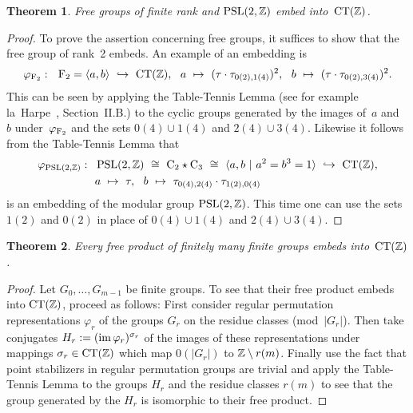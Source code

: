 \documentclass{amsart}
\theoremstyle{definition} \newtheorem{CTZDefinition}{Definition}[section]
\theoremstyle{plain}      \newtheorem{CTZPropertiesTheorem}[CTZDefinition]{Theorem}
\theoremstyle{plain}      \newtheorem{CTZSubgroupsTheorem}[CTZDefinition]{Theorem}
\theoremstyle{definition} \newtheorem{RcwaMappingDefinition}{Definition}[section]
\theoremstyle{definition} \newtheorem{RCWADefinition}[RcwaMappingDefinition]{Definition}
\theoremstyle{plain}      \newtheorem{CTZNotFinitelyGeneratedTheorem}
\theoremstyle{definition} \newtheorem{CTZSmEmbeddingDefinition}[RcwaMappingDefinition]{Definition}
\theoremstyle{plain}      \newtheorem{CTZHighlyTransitiveTheorem}[RcwaMappingDefinition]{Theorem}
\theoremstyle{plain}      \newtheorem{CTZTorsionElementsDivisibleTheorem}
\theoremstyle{plain}      \newtheorem{CTLemma}{Lemma}[section]
\theoremstyle{plain}      \newtheorem{IntegralCommutatorLemma}[CTLemma]{Lemma}
\theoremstyle{plain}      \newtheorem{NormalSubgroupContainsIntegralElementLemma}[CTLemma]{Lemma}
\theoremstyle{plain}      \newtheorem{CTZSimpleTheorem}[CTLemma]{Theorem}
\theoremstyle{remark}     \newtheorem{CTZSimpleRemark}[CTLemma]{Remark}
\theoremstyle{definition} \newtheorem{CTPZDefinition}[CTLemma]{Definition}
\theoremstyle{plain}      \newtheorem{CTPZSimpleCorollary}[CTLemma]{Corollary}
\theoremstyle{plain}      \newtheorem{CTPZSimpleProblem}[CTLemma]{Problem}
\theoremstyle{plain}      \newtheorem{FnPSL2ZEmbeddingTheorem}{Theorem}[section]
\theoremstyle{plain}      \newtheorem{FreeProductEmbeddingTheorem}[FnPSL2ZEmbeddingTheorem]{Theorem}
\theoremstyle{definition} \newtheorem{RestrictionMonomorphismDefinition}
\theoremstyle{plain}      \newtheorem{DirectAndWreathProductsEmbeddingTheorem}
\theoremstyle{plain}      \newtheorem{DirectAndWreathProductsEmbeddingCorollary}
\theoremstyle{definition} \newtheorem{CTintZDefinition}[FnPSL2ZEmbeddingTheorem]{Definition}
\theoremstyle{plain}      \newtheorem{CTintZSimpleTheorem}[FnPSL2ZEmbeddingTheorem]{Theorem}
\theoremstyle{definition} \newtheorem{KernelDefinition}{Definition}[section]
\theoremstyle{definition} \newtheorem{TameWildDefinition}[KernelDefinition]{Definition}
\theoremstyle{definition} \newtheorem{SimpleSupergroupsDefinition}[KernelDefinition]{Definition}
\theoremstyle{definition} \newtheorem{CSCRDefinition}[KernelDefinition]{Definition}
\theoremstyle{plain}      \newtheorem{SimpleSupergroupsGeneratorsTheorem}[KernelDefinition]{Theorem}
\theoremstyle{plain}      \newtheorem{SimpleSupergroupsTheorem}[KernelDefinition]{Theorem}
\theoremstyle{plain}      \newtheorem{SimpleSupergroupsTransitivityTheorem}
\theoremstyle{plain}      \newtheorem{TameGenerationConjecture}[KernelDefinition]{Conjecture}
\theoremstyle{remark}     \newtheorem{TameGenerationRemark}[KernelDefinition]{Remark}
\begin{document}
\begin{FnPSL2ZEmbeddingTheorem} \label{FnPSL2ZEmbeddingTheorem}
  Free groups of finite rank and \(\PSL{2}{\ZZ}\) embed into~\(\CT{\ZZ}\).
\end{FnPSL2ZEmbeddingTheorem}
\begin{proof}
  To prove the assertion concerning free groups, it suffices to show that the free group
  of rank~2 embeds. An example of an embedding is
  \[
    \varphi_{{\rm F}_2}: \ \ {\textrm F}_2 = \langle a, b \rangle \
    \hookrightarrow \ \CT{\ZZ}, \ \
    a \ \mapsto \ (\tau \cdot \tau_{0(2),1(4)})^2, \ \ 
    b \ \mapsto \ (\tau \cdot \tau_{0(2),3(4)})^2.
  \]
  This can be seen by applying the Table-Tennis Lemma (see for example
  la~Harpe~\cite{LaHarpe00}, Section~II.B.) to the cyclic groups generated by the
  images of~\(a\) and~\(b\) under~\(\varphi_{{\rm F}_2}\) and the sets \(0(4) \cup 1(4)\) and
  \(2(4) \cup 3(4)\). 
  Likewise it follows from the Table-Tennis Lemma that
  \begin{align*}
    \varphi_{\PSL{2}{\ZZ}}: \ \ &\PSL{2}{\ZZ} \ \cong \ {\rm C}_2 \star {\rm C}_3 \ \cong \
    \langle a,b \ | \ a^2 = b^3 = 1 \rangle \ \hookrightarrow \ \CT{\ZZ}, \\
    &a \ \mapsto \ \tau, \ \ b \ \mapsto \ \tau_{0(4),2(4)} \cdot \tau_{1(2),0(4)}
  \end{align*}
  is an embedding of the modular group \(\PSL{2}{\ZZ}\). This time one can use the
  sets \(1(2)\) and \(0(2)\) in place of \(0(4) \cup 1(4)\) and \(2(4) \cup 3(4)\).
\end{proof}

\begin{FreeProductEmbeddingTheorem} \label{FreeProductEmbeddingTheorem}
  Every free product of finitely many finite groups embeds into~\(\CT{\ZZ}\).
\end{FreeProductEmbeddingTheorem}
\begin{proof}
  Let \(G_0, \dots, G_{m-1}\) be finite groups. To see that their free product embeds
  into \(\CT{\ZZ}\), proceed as follows: First consider regular permutation representations
  \(\varphi_r\) of the groups \(G_r\) on the residue classes (mod~\(|G_r|\)).
  Then take conjugates \(H_r := (\im \varphi_r)^{\sigma_r}\) of the images of these
  representations under mappings \(\sigma_r \in \CT{\ZZ}\) which map \(0(|G_r|)\) to
  \(\mathbb{Z} \setminus r(m)\). Finally use the fact that point stabilizers in regular permutation
  groups are trivial and apply the Table-Tennis Lemma to the groups \(H_r\) and the residue
  classes \(r(m)\) to see that the group generated by the \(H_r\) is isomorphic to their
  free product.
\end{proof}
\end{document}
